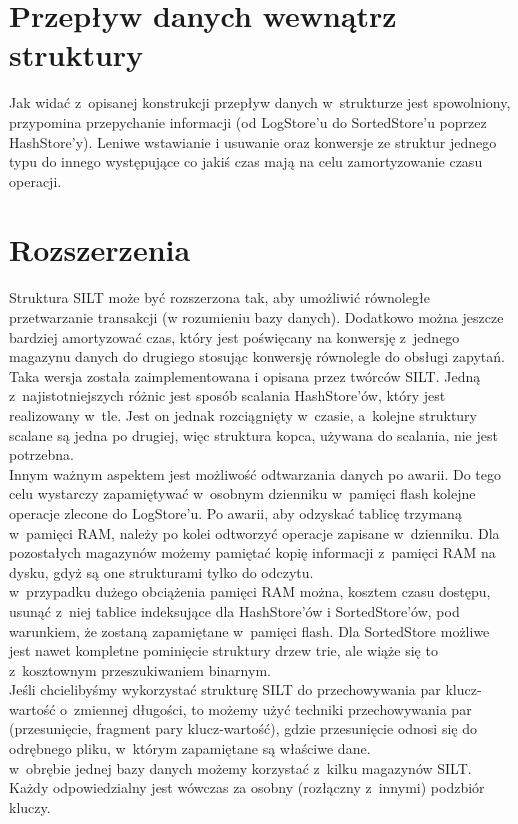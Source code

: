 \documentclass[declaration,shortabstract,masc]{iithesis}
\begin{document}
		\section{Przepływ danych wewnątrz struktury}
			Jak widać z~opisanej konstrukcji przepływ danych w~strukturze jest spowolniony, przypomina przepychanie informacji (od LogStore'u do SortedStore'u poprzez HashStore'y). Leniwe wstawianie i usuwanie oraz konwersje ze struktur jednego typu do innego występujące co jakiś czas mają na celu zamortyzowanie czasu operacji.
		\section{Rozszerzenia}
			Struktura SILT może być rozszerzona tak, aby umożliwić równoległe przetwarzanie transakcji (w rozumieniu bazy danych). Dodatkowo można jeszcze bardziej amortyzować czas, który jest poświęcany na konwersję z~jednego magazynu danych do drugiego stosując konwersję równolegle do obsługi zapytań. Taka wersja została zaimplementowana i opisana przez twórców SILT. Jedną z~najistotniejszych różnic jest sposób scalania HashStore'ów, który jest realizowany w~tle. Jest on jednak rozciągnięty w~czasie, a~kolejne struktury scalane są jedna po drugiej, więc struktura kopca, używana do scalania, nie jest potrzebna.\\
			\indent Innym ważnym aspektem jest możliwość odtwarzania danych po awarii. Do tego celu wystarczy zapamiętywać w~osobnym dzienniku w~pamięci flash kolejne operacje zlecone do LogStore'u. Po awarii, aby odzyskać tablicę trzymaną w~pamięci RAM, należy po kolei odtworzyć operacje zapisane w~dzienniku. Dla pozostałych magazynów możemy pamiętać kopię informacji z~pamięci RAM na dysku, gdyż są one strukturami tylko do odczytu.\\
			\indent w~przypadku dużego obciążenia pamięci RAM można, kosztem czasu dostępu, usunąć z~niej tablice indeksujące dla HashStore'ów i SortedStore'ów, pod warunkiem, że zostaną zapamiętane w~pamięci flash. Dla SortedStore możliwe jest nawet kompletne pominięcie struktury drzew trie, ale wiąże się to z~kosztownym przeszukiwaniem binarnym.\\
			\indent Jeśli chcielibyśmy wykorzystać strukturę SILT do przechowywania par klucz-wartość o~zmiennej długości, to możemy użyć techniki przechowywania par (przesunięcie, fragment pary klucz-wartość), gdzie przesunięcie odnosi się do odrębnego pliku, w~którym zapamiętane są właściwe dane.\\
			\indent w~obrębie jednej bazy danych możemy korzystać z~kilku magazynów SILT. Każdy odpowiedzialny jest wówczas za osobny (rozłączny z~innymi) podzbiór kluczy.
\end{document}
